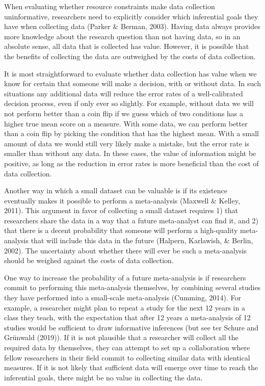 \documentclass[
  english,
  ,jou, a4paper,floatsintext]{apa6}
\begin{document}
When evaluating whether resource constraints make data collection uninformative, researchers need to explicitly consider which inferential goals they have when collecting data (Parker \& Berman, 2003). Having data always provides more knowledge about the research question than not having data, so in an absolute sense, all data that is collected has value. However, it is possible that the benefits of collecting the data are outweighed by the costs of data collection.

It is most straightforward to evaluate whether data collection has value when we know for certain that someone will make a decision, with or without data. In such situations any additional data will reduce the error rates of a well-calibrated decision process, even if only ever so slightly. For example, without data we will not perform better than a coin flip if we guess which of two conditions has a higher true mean score on a measure. With some data, we can perform better than a coin flip by picking the condition that has the highest mean. With a small amount of data we would still very likely make a mistake, but the error rate is smaller than without any data. In these cases, the value of information might be positive, as long as the reduction in error rates is more beneficial than the cost of data collection.

Another way in which a small dataset can be valuable is if its existence eventually makes it possible to perform a meta-analysis (Maxwell \& Kelley, 2011). This argument in favor of collecting a small dataset requires 1) that researchers share the data in a way that a future meta-analyst can find it, and 2) that there is a decent probability that someone will perform a high-quality meta-analysis that will include this data in the future (Halpern, Karlawish, \& Berlin, 2002). The uncertainty about whether there will ever be such a meta-analysis should be weighed against the costs of data collection.

One way to increase the probability of a future meta-analysis is if researchers commit to performing this meta-analysis themselves, by combining several studies they have performed into a small-scale meta-analysis (Cumming, 2014). For example, a researcher might plan to repeat a study for the next 12 years in a class they teach, with the expectation that after 12 years a meta-analysis of 12 studies would be sufficient to draw informative inferences (but see ter Schure and Grünwald (2019)). If it is not plausible that a researcher will collect all the required data by themselves, they can attempt to set up a collaboration where fellow researchers in their field commit to collecting similar data with identical measures. If it is not likely that sufficient data will emerge over time to reach the inferential goals, there might be no value in collecting the data.
\end{document}

